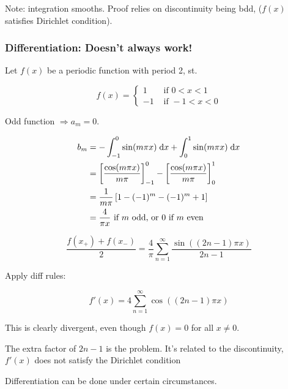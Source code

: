 \documentclass[a4paper]{article}
\begin{document}
Note: integration smooths. Proof relies on discontinuity being bdd, ($ f(x) $ satisfies Dirichlet condition). 

\subsubsection{Differentiation: Doesn't always work!}

Let $ f(x) $ be a periodic function with period 2, st.

\[ f(x) = \begin{cases} 1  & \text{ if } 0 < x < 1 \\ - 1 & \text{ if } -1 < x < 0 \end{cases} \]

Odd function $ \Rightarrow a_{m} = 0 $.

\begin{align*}
	b_{m} & = - \int_{-1}^{0} \sin(m \pi x) \; \mathrm{d} x + \int_{0}^{1} \sin(m \pi x) \; \mathrm{d} x \\
	& = \left[  \frac{\cos(m \pi x)}{m \pi} \right]_{-1}^{0} - \left[  \frac{\cos(m \pi x)}{m \pi} \right]_{0}^{1}\\
	& = \frac{1}{m \pi} \left[  1 - (-1)^{m} - (-1)^{m} + 1 \right]   \\
	& = \frac{4}{\pi x} \text{ if } m  \text{ odd, or } 0 \text{ if } m \text{ even }
\end{align*}



\[ \frac{f(x_{+}) + f(x_{-})}{2}  = \frac{4}{\pi} \sum_{n=1}^{\infty} \frac{\sin\left(  (2n - 1)\pi x \right) }{2n - 1} \]

Apply diff rules:

\[ f'(x) = 4 \sum_{n=1}^{\infty} \cos \left( (2n - 1)\pi x \right)  \]

This is clearly divergent, even though $ f(x) = 0 $ for all $ x \neq 0 $.

 The extra factor of $ 2n - 1 $ is the problem. It's related to the discontinuity, $ f'(x) $ does not satisfy the Dirichlet condition
 
Differentiation can be done under certain circumstances. 
\end{document}
